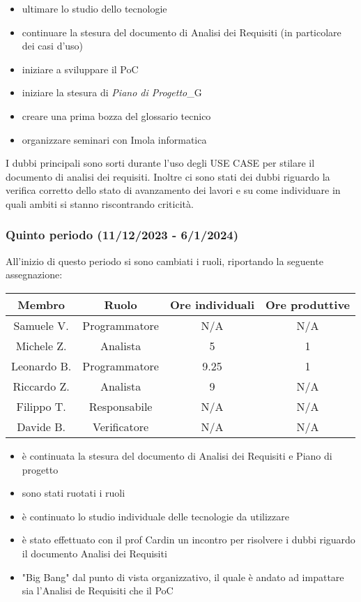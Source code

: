 \begin{itemize}
    \item ultimare lo studio dello tecnologie
    \item continuare la stesura del documento di Analisi dei Requisiti (in particolare dei casi d'uso)
    \item iniziare a sviluppare il PoC
    \item iniziare la stesura di \textit{Piano di Progetto}_G
    \item creare una prima bozza del glossario tecnico
    \item organizzare seminari con Imola informatica
\end{itemize}


I dubbi principali sono sorti durante l'uso degli USE CASE per stilare il documento di analisi dei requisiti. Inoltre ci sono stati dei dubbi riguardo la verifica corretto dello stato di avanzamento dei lavori e su come individuare in quali ambiti si stanno riscontrando criticità. 

\subsubsection{Quinto periodo (11/12/2023 - 6/1/2024)}
All'inizio di questo periodo si sono cambiati i ruoli, riportando la seguente assegnazione:

\vspace{10 mm}
\begin{tabular}{|c|c|c|c|}
\hline
\textbf{Membro} & \textbf{Ruolo} & \textbf{Ore individuali} & \textbf{Ore produttive} \\
\hline
Samuele V. & Programmatore & N/A & N/A \\
\hline
Michele Z. & Analista & 5 & 1 \\
\hline
Leonardo B. & Programmatore & 9.25 & 1 \\
\hline
Riccardo Z. & Analista & 9 & N/A \\
\hline
Filippo T. & Responsabile & N/A & N/A \\
\hline
Davide B. & Verificatore & N/A & N/A \\
\hline
\end{tabular}
\vspace{10 mm}

\begin{itemize}
    \item è continuata la stesura del documento di Analisi dei Requisiti e Piano di progetto
    \item sono stati ruotati i ruoli
    \item è continuato lo studio individuale delle tecnologie da utilizzare
    \item è stato effettuato con il prof Cardin un incontro per risolvere i dubbi riguardo il documento Analisi dei Requisiti
    \item "Big Bang" dal punto di vista organizzativo, il quale è andato ad impattare sia l'Analisi de Requisiti che il PoC
\end{itemize}

